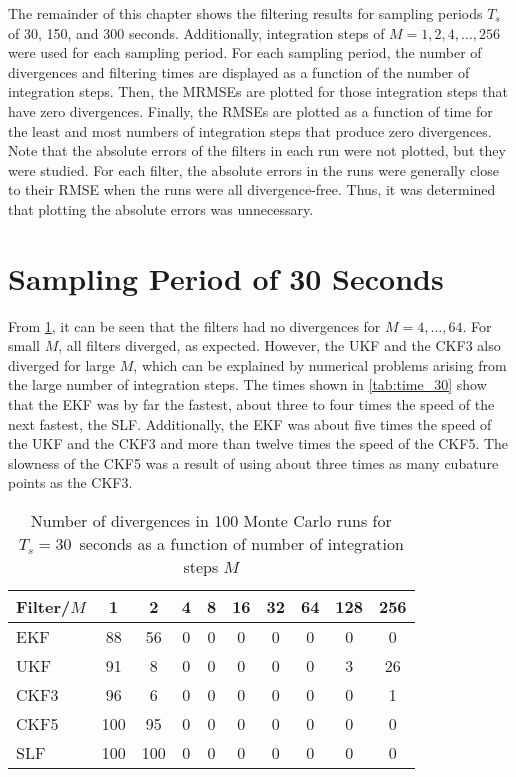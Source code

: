 \documentclass[../zhang_thesis.tex]{subfiles}
\begin{document}
The remainder of this chapter shows the filtering results for sampling periods $T_s$ of 30, 150, and 300 seconds. Additionally, integration steps of $M=1,2,4,\dots,256$ were used for each sampling period. For each sampling period, the number of divergences and filtering times are displayed as a function of the number of integration steps. Then, the MRMSEs are plotted for those integration steps that have zero divergences. Finally, the RMSEs are plotted as a function of time for the
least and most numbers of integration steps that produce zero divergences. Note that the absolute errors of the filters in each run were not plotted, but they were studied. For each filter, the absolute errors in the runs were generally close to their RMSE when the runs were all divergence-free. Thus, it was determined that plotting the absolute errors was unnecessary.

\section{Sampling Period of 30 Seconds}

From \cref{tab:div_30}, it can be seen that the filters had no divergences for $M=4,\dots,64$. For small $M$, all filters diverged, as expected. However, the UKF and the CKF3 also diverged for large $M$, which can be explained by numerical problems arising from the large number of integration steps. The times shown in \cref{tab:time_30} show that the EKF was by far the fastest, about three to four times the speed of the next fastest, the SLF. Additionally, the EKF was about five times the
speed of the UKF and the CKF3 and more than twelve times the speed of the CKF5. The slowness of the CKF5 was a result of using about three times as many cubature points as the CKF3.

\begin{table}[h]
\centering
\caption{Number of divergences in 100 Monte Carlo runs for $T_s=30$~seconds as a function of number of integration steps $M$}
\begin{tabular}{@{}l*{9}{c}@{}}
\toprule
Filter/$M$ & 1   & 2   & 4 & 8 & 16 & 32 & 64 & 128 & 256 \\
\midrule
EKF        & 88  & 56  & 0 & 0 & 0  & 0 & 0 & 0 & 0   \\
UKF        & 91  & 8   & 0 & 0 & 0  & 0 & 0 & 3 & 26  \\
CKF3       & 96  & 6   & 0 & 0 & 0  & 0 & 0 & 0 & 1   \\
CKF5       & 100 & 95  & 0 & 0 & 0  & 0 & 0 & 0 & 0   \\
SLF        & 100 & 100 & 0 & 0 & 0  & 0 & 0 & 0 & 0   \\
\bottomrule
\end{tabular}
\label{tab:div_30}
\end{table}
\end{document}
